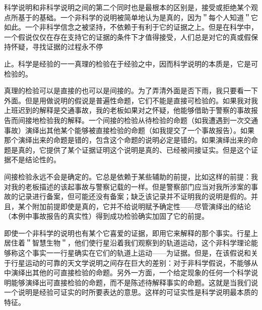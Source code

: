 科学说明和非科学说明之间的第二个同时也是最根本的区别是，接受或拒绝某个观点所基于的基础。一个非科学的说明被简单地认为是真的，因为＂每个人知道＂它如此。一个非科学信念之被坚持，不依赖于有利于它的证据之上。但是在科学中，一个假说仅仅在存在支持它的证据的条件下才值得接受，人们总是对它的真或假保持怀疑，寻找证据的过程永不停

止。科学是经验的一一真理的检验在于经验之中，因而科学说明的本质是，它是可检验的。

真理的检验可以是直接的也可以是间接的。为了弄清外面是否下雨，我只要看一下外面。但是用做说明的假说是普遍性命题，它们不能是直接可检验的。如果我对我上班迟到的解释是交通事故，我的老板如果对之怀疑，他能够借助于警察的事故报告而间接地检验我的解释。一个间接的检验从待检验的命题（如我遭遇到一次交通事故）演绎出其他某个能够被直接检验的命题（如我提交了一个事故报告）。如果那个演绎出来的命题是错的，包含这个命题的说明必定是错的。如果演绎出来的命题是真的，它提供了某个证据证明这个说明是真的、已经被间接证实。但是这个证据不是结论性的。

间接检验永远不会是确定的。它总是依赖于某些辅助的前提，比如这样的前提：我对我的老板描述的该起事故与警察记载的一样。但是警察部门应当对我所涉案的事故的记录进行备案，但可能还没有备案；缺乏该记录并不证明我的说明是假的。并且，某个附加前提即使是真的，它并不给说明赋予确定性——尽管演绎出的结论（本例中事故报告的真实性）得到成功检验确实加固了它的前提。

即使一个非科学的说明也有某个它喜爱的证据，即用它来解释的那个事实。行星上居住着＂智慧生物＂，他们使行星沿着我们观察到的轨道运动，这个非科学理论能够称这个事实一一行星确实在它们的轨道上运动——为证据。但是，在该假说和关于行星运动的可靠的天文学说明之间存在巨大的差别：对于非科学假说，不能够从中演绎出其他的可直接检验的命题。另外一方面，一个给定现象的任何一个科学说明能够演绎出可直接检验的命题，而不是陈述待解释事实的命题。这就是当我们说一个说明是经验可证实的时所要表达的意思。这样的可证实性是科学说明最本质的特征。\cite{popper1935} 

